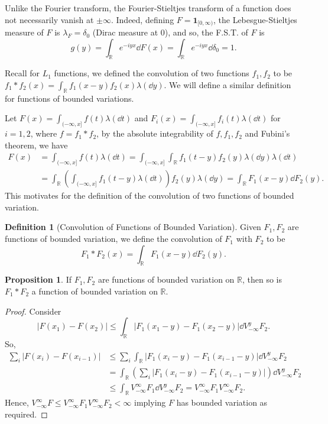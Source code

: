 \documentclass[]{article}
\theoremstyle{definition}
\theoremstyle{definition}
\newtheorem{definition}{Definition}[section]
\newtheorem{proposition}{Proposition}[section]
\begin{document}
Unlike the Fourier transform, the Fourier-Stieltjes transform of a function 
does not necessarily vanish at \(\pm \infty\). Indeed, defining 
\(F = \mathbf{1}_{[0, \infty)}\), the Lebesgue-Stieltjes measure of \(F\) 
is \(\lambda_F = \delta_0\) (Dirac measure at 0), and so, the F.S.T. of \(F\) is 
\[g(y) = \int_{\mathbb{R}} e^{-iyx} \dd F(x) = 
  \int_{\mathbb{R}} e^{-iyx} \dd \delta_0 = 1.\]

Recall for \(L_1\) functions, we defined the convolution of two functions 
\(f_1, f_2\) to be \(f_1 * f_2(x) = \int_{\mathbb{R}}f_1(x - y)f_2(x) \lambda(\dd y)\).
We will define a similar definition for functions of bounded variations.

Let \(F(x) = \int_{(-\infty, x]}f(t) \lambda(\dd t)\) and 
\(F_i(x) = \int_{(-\infty, x]}f_i(t) \lambda(\dd t)\) for \(i = 1, 2\),
where \(f = f_1 * f_2\),  
by the absolute integrability of \(f, f_1, f_2\) and Fubini's theorem, 
we have 
\[\begin{split}
  F(x) & = \int_{(-\infty, x]} f(t) \lambda(\dd t) = 
  \int_{(-\infty, x]} \int_{\mathbb{R}}f_1(t - y)f_2(y)\lambda(\dd y)\lambda(\dd t)\\
  & = \int_{\mathbb{R}}\left(\int_{(-\infty, x]} f_1(t - y) \lambda(\dd t)\right)f_2(y) \lambda(\dd y)
    = \int_{\mathbb{R}}F_1(x - y) \dd F_2(y).
\end{split}\]
This motivates for the definition of the convolution of two functions of bounded 
variation.

\begin{definition}[Convolution of Functions of Bounded Variation]
  Given \(F_1, F_2\) are functions of bounded variation, we define the 
  convolution of \(F_1\) with \(F_2\) to be
  \[F_1 * F_2(x) = \int_{\mathbb{R}} F_1(x - y) \dd F_2(y).\]
\end{definition}

\begin{proposition}
  If \(F_1, F_2\) are functions of bounded variation on \(\mathbb{R}\), 
  then so is \(F_1 * F_2\) a function of bounded variation on \(\mathbb{R}\).
\end{proposition}
\begin{proof}
  Consider 
  \[|F(x_1) - F(x_2)| 
    \le \int_{\mathbb{R}}|F_1(x_1 - y) - F_1(x_2 - y)| \dd V_{-\infty}^y F_2.\]
  So, 
  \[\begin{split}
    \sum_i |F(x_i) - F(x_{i - 1})| 
    & \le \sum_i \int_{\mathbb{R}}|F_1(x_i - y) - F_1(x_{i - 1} - y)| \dd V_{-\infty}^y F_2\\
    & = \int_{\mathbb{R}} \left(\sum_i|F_1(x_i - y) - F_1(x_{i - 1} - y)|\right) \dd V_{-\infty}^y F_2\\
    & \le \int_{\mathbb{R}} V_{-\infty}^\infty F_1 \dd V_{-\infty}^y F_2 
      = V_{-\infty}^\infty F_1 V_{-\infty}^\infty F_2.
  \end{split}\]
  Hence, \(V_{-\infty}^\infty F \le V_{-\infty}^\infty F_1 V_{-\infty}^\infty F_2 < \infty\) 
  implying \(F\) has bounded variation as required.
\end{proof}
\end{document}
